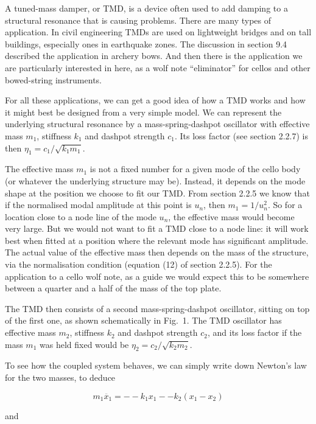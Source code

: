   A tuned-mass damper, or TMD, is a device often used to add damping to a 
  structural resonance that is causing problems. There are many types of 
  application. In civil engineering TMDs are used on lightweight bridges and on 
  tall buildings, especially ones in earthquake zones. The discussion in 
  section 9.4 described the application in archery bows. And then there is the 
  application we are particularly interested in here, as a wolf note 
  ``eliminator'' for cellos and other bowed-string instruments. 

  For all these applications, we can get a good idea of how a TMD works and how 
  it might best be designed from a very simple model. We can represent the 
  underlying structural resonance by a mass-spring-dashpot oscillator with 
  effective mass $m_1$, stiffness $k_1$ and dashpot strength $c_1$. Its loss 
  factor (see section 2.2.7) is then $\eta_1=c_1/\sqrt{k_1 m_1}$. 

  The effective mass $m_1$ is not a fixed number for a given mode of the cello 
  body (or whatever the underlying structure may be). Instead, it depends on 
  the mode shape at the position we choose to fit our TMD. From section 2.2.5 
  we know that if the normalised modal amplitude at this point is $u_n$, then 
  $m_1=1/u_n^2$. So for a location close to a node line of the mode $u_n$, the 
  effective mass would become very large. But we would not want to fit a TMD 
  close to a node line: it will work best when fitted at a position where the 
  relevant mode has significant amplitude. The actual value of the effective 
  mass then depends on the mass of the structure, via the normalisation 
  condition (equation (12) of section 2.2.5). For the application to a cello 
  wolf note, as a guide we would expect this to be somewhere between a quarter 
  and a half of the mass of the top plate. 

  The TMD then consists of a second mass-spring-dashpot oscillator, sitting on 
  top of the first one, as shown schematically in Fig.\ 1. The TMD oscillator 
  has effective mass $m_2$, stiffness $k_2$ and dashpot strength $c_2$, and its 
  loss factor if the mass $m_1$ was held fixed would be $\eta_2=c_2/\sqrt{k_2 
  m_2}$. 

  To see how the coupled system behaves, we can simply write down Newton's law 
  for the two masses, to deduce 

  $$m_1 \ddot{x_1} = -- k_1 x_1 -- k_2 (x_1 -x_2) \tag{1}$$ 

  and 

